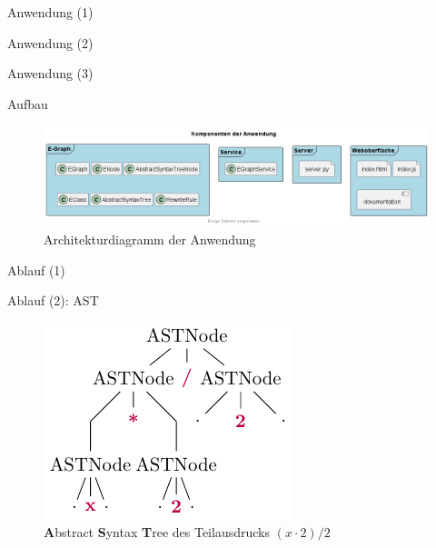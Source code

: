 \begin{frame}{Anwendung (1)}
    
\end{frame}

\begin{frame}{Anwendung (2)}
    
\end{frame}

\begin{frame}{Anwendung (3)}
    
\end{frame}

\begin{frame}{Aufbau}
    \begin{figure}[H]
        \centering
        \includegraphics[scale=0.43]{utils/components.png}
        \caption{Architekturdiagramm der Anwendung}
        \label{fig:comps}
    \end{figure}
\end{frame}

\begin{frame}{Ablauf (1)}
    \begin{tcbitemize}[raster equal height=rows, raster columns=3, raster column skip = 1.5cm,
        raster every box/.style={size=small,valign=center,halign=center,colframe=white,colback=white}]
        \tcbitem {}
    \end{tcbitemize}\vspace{5mm}
\end{frame}

\begin{frame}{Ablauf (2): AST}
    \begin{figure}[H]
        \centering
        \includegraphics[scale=1.4]{utils/ast.pdf}
        \caption{\textbf{A}bstract \textbf{S}yntax \textbf{T}ree des Teilausdrucks $(x \cdot 2) / 2$}
        \label{fig:komponenten}
    \end{figure}
\end{frame}

